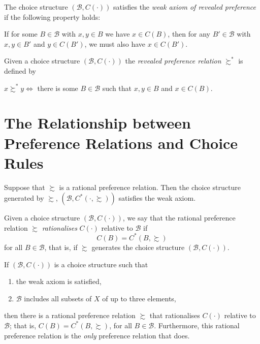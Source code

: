 \begin{defn}
    The choice structure $(\mathscr{B}, C(\cdot))$ satisfies the \emph{weak axiom of revealed preference} if the following property holds:

    If for some $B \in \mathscr{B}$ with $x, y \in B$ we have $x \in C(B)$, then for any $B' \in \mathscr{B}$ with $x, y \in B'$ and $y \in C(B')$, we must also have $x \in C(B')$.
\end{defn}

\begin{defn}
    Given a choice structure $(\mathscr{B}, C(\cdot))$ the \emph{revealed preference relation} $\succsim^*$ is defined by 

    $x \succsim^* y \iff$ there is some $B \in \mathscr{B}$ such that $x, y \in B$ and $x \in C(B)$.
\end{defn}

\section{The Relationship between Preference Relations and Choice Rules}

\begin{prop}
    Suppose that $\succsim$ is a rational preference relation. Then the choice structure generated by $\succsim$, $(\mathscr{B}, C^*(\cdot, \succsim))$ satisfies the weak axiom.
\end{prop}

\begin{defn}
    Given a choice structure $(\mathscr{B}, C(\cdot))$, we say that the rational preference relation $\succsim$ \emph{rationalises} $C(\cdot)$ relative to $\mathscr{B}$ if
    \begin{equation*}
        C(B) = C^*(B, \succsim)
    \end{equation*}
    for all $B \in \mathscr{B}$, that is, if $\succsim$ generates the choice structure $(\mathscr{B}, C(\cdot))$.
\end{defn}

\begin{prop}
    If $(\mathscr{B}, C(\cdot))$ is a choice structure such that
    \begin{enumerate}
        \item the weak axiom is satisfied,
        \item $\mathscr{B}$ includes all subsets of $X$ of up to three elements,
    \end{enumerate}
    then there is a rational preference relation $\succsim$ that rationalises $C(\cdot)$ relative to $\mathscr{B}$; that is, $C(B) = C^*(B, \succsim)$, for all $B \in \mathscr{B}$. Furthermore, this rational preference relation is the \emph{only} preference relation that does.
\end{prop}
